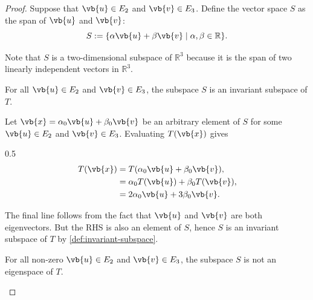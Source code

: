 \begin{enumerate}
\begin{enumerate}
\begin{proof}
                    \smallskip

                    Suppose that $\vb{u} \in E_2$ and $\vb{v} \in E_3$.
                    Define the vector space $S$ as the span of $\vb{u}$ and $\vb{v}$:
                    \[ S := \{\alpha \vb{u} + \beta \vb{v} \; | \; \alpha, \beta \in \mathbb{R}\}. \]

                    Note that $S$ is a two-dimensional subspace of $\mathbb{R}^3$ because it is the span of two linearly independent vectors in $\mathbb{R}^3$.

                    \smallskip

                    \begin{claim} \label{claim:4b-3}
                        For all $\vb{u} \in E_2$ and $\vb{v} \in E_3$, the subspace $S$ is an invariant subspace of $T$.
                    \end{claim}

                    \begin{subproof}
                        Let $\vb{x} = \alpha_0 \vb{u} + \beta_0 \vb{v}$ be an arbitrary element of $S$ for some $\vb{u} \in E_2$ and $\vb{v} \in E_3$.
                        Evaluating $T(\vb{x})$ gives
                        \begin{spreadlines}{0.5\baselineskip}
                            \begin{align*}
                                T(\vb{x}) &= T(\alpha_0 \vb{u} + \beta_0 \vb{v}), \\
                                &= \alpha_0 T(\vb{u}) + \beta_0 T(\vb{v}), \\
                                &= 2 \alpha_0 \vb{u} + 3 \beta_0 \vb{v}.
                            \end{align*}
                        \end{spreadlines}
                        The final line follows from the fact that $\vb{u}$ and $\vb{v}$ are both eigenvectors.
                        But the RHS is also an element of $S$, hence $S$ is an invariant subspace of $T$ by \cref{def:invariant-subspace}.
                    \end{subproof}

                    \smallskip

                    \begin{claim} \label{claim:4b-4}
                        For all non-zero $\vb{u} \in E_2$ and $\vb{v} \in E_3$, the subspace $S$ is not an eigenspace of $T$.
                    \end{claim}


\end{proof}
\end{enumerate}
\end{enumerate}
